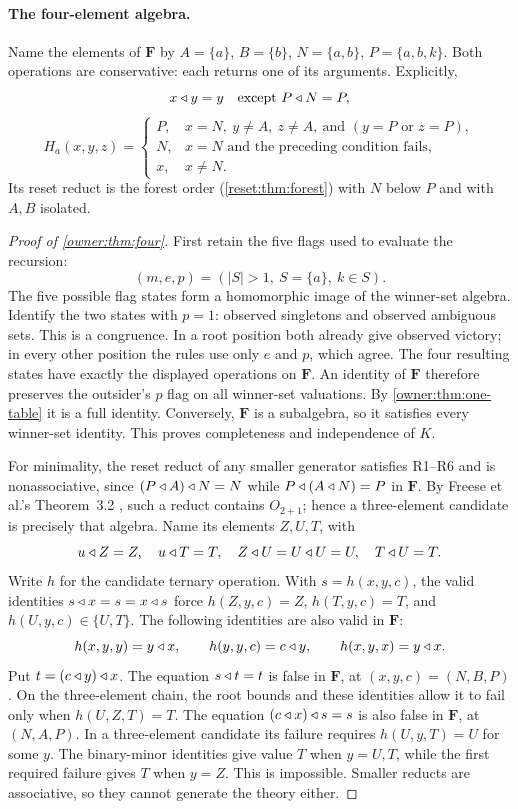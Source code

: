\paragraph{The four-element algebra.}
Name the elements of $\mathbf F$ by $A=\{a\}$, $B=\{b\}$, $N=\{a,b\}$, $P=\{a,b,k\}$. Both operations are conservative: each returns one of its arguments. Explicitly,
\[
 x\mathbin{\triangleleft} y=y\quad\text{except }P\mathbin{\triangleleft} N=P,
\]
\[
 H_a(x,y,z)=\begin{cases}
 P,&x=N,\ y\ne A,\ z\ne A,\ \text{and }(y=P\text{ or }z=P),\\
 N,&x=N\text{ and the preceding condition fails},\\
 x,&x\ne N.
 \end{cases}
\]
Its reset reduct is the forest order (\cref{reset:thm:forest}) with $N$ below $P$ and with $A,B$ isolated.

\begin{proof}[Proof of \cref{owner:thm:four}]
First retain the five flags used to evaluate the recursion:
\[
 (m,e,p)=(|S|>1,\ S=\{a\},\ k\in S).
\]
The five possible flag states form a homomorphic image of the winner-set
algebra. Identify the two states with $p=1$: observed singletons and
observed ambiguous sets. This is a congruence. In a root position both
already give observed victory; in every other position the rules use
only $e$ and $p$, which agree. The four resulting states have exactly
the displayed operations on $\mathbf F$.
An identity of $\mathbf F$ therefore preserves the outsider's $p$ flag
on all winner-set valuations. By \cref{owner:thm:one-table} it is a full
identity. Conversely, $\mathbf F$ is a subalgebra, so it satisfies every
winner-set identity. This proves completeness and independence of $K$.

For minimality, the reset reduct of any smaller generator satisfies R1--R6 and is nonassociative, since $(P\mathbin{\triangleleft} A)\mathbin{\triangleleft} N=N$ while $P\mathbin{\triangleleft}(A\mathbin{\triangleleft} N)=P$ in $\mathbf F$.
By Freese et al.'s Theorem~3.2 \cite{FreeseEtAl2002}, such a reduct
contains $O_{2+1}$; hence a three-element candidate is precisely that
algebra. Name its elements $Z,U,T$, with
\[
 u\mathbin{\triangleleft} Z=Z,\quad u\mathbin{\triangleleft} T=T,\quad
 Z\mathbin{\triangleleft} U=U\mathbin{\triangleleft} U=U,\quad T\mathbin{\triangleleft} U=T.
\]
Write $h$ for the candidate ternary operation. With $s=h(x,y,c)$,
the valid identities $s\mathbin{\triangleleft} x=s=x\mathbin{\triangleleft} s$ force
$h(Z,y,c)=Z$, $h(T,y,c)=T$, and $h(U,y,c)\in\{U,T\}$.
The following identities are also valid in $\mathbf F$:
\[
 h(x,y,y)=y\mathbin{\triangleleft} x,\qquad h(y,y,c)=c\mathbin{\triangleleft} y,\qquad
 h(x,y,x)=y\mathbin{\triangleleft} x.
\]
Put $t=(c\mathbin{\triangleleft} y)\mathbin{\triangleleft} x$. The equation $s\mathbin{\triangleleft} t=t$ is false in
$\mathbf F$, at $(x,y,c)=(N,B,P)$. On the three-element chain,
the root bounds and these identities allow it to fail only when
$h(U,Z,T)=T$.
The equation $(c\mathbin{\triangleleft} x)\mathbin{\triangleleft} s=s$ is also false in $\mathbf F$, at
$(N,A,P)$. In a three-element candidate its failure requires
$h(U,y,T)=U$ for some $y$. The binary-minor identities give value $T$
when $y=U,T$, while the first required failure gives $T$ when $y=Z$.
This is impossible. Smaller reducts are associative, so they cannot
generate the theory either.
\end{proof}

